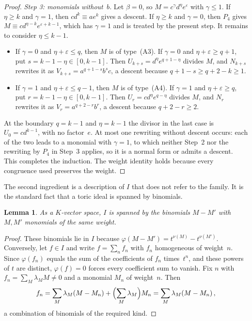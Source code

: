 \documentclass[11pt,letterpaper]{article}
\numberwithin{equation}{section}
\theoremstyle{plain}
\newtheorem{lemma}[theorem]{Lemma}
\theoremstyle{remark}
\begin{document}
\begin{proof}
\emph{Step 3: monomials without~$b$.} Let $\beta=0$, so $M=c^{\gamma}d^{\eta}e^{\varepsilon}$ with $\gamma\le 1$. If $\eta\ge k$ and $\gamma=1$, then $cd^k\equiv ae^k$ gives a descent. If $\eta\ge k$ and $\gamma=0$, then $P_4$ gives $M\equiv cd^{\eta-k}e^{\varepsilon+k-1}$, which has $\gamma=1$ and is treated by the present step. It remains to consider $\eta\le k-1$.
\begin{itemize}
\item If $\gamma=0$ and $\eta+\varepsilon\le q$, then $M$ is of type~(A3). If $\gamma=0$ and $\eta+\varepsilon\ge q+1$, put $s=k-1-\eta\in[0,k-1]$. Then $U_{k+s}=d^{\eta}e^{q+1-\eta}$ divides $M$, and $N_{k+s}$ rewrites it as $V_{k+s}=a^{q+1-s}b^{s}c$, a descent because $q+1-s\ge q+2-k\ge 1$.
\item If $\gamma=1$ and $\eta+\varepsilon\le q-1$, then $M$ is of type~(A4). If $\gamma=1$ and $\eta+\varepsilon\ge q$, put $r=k-1-\eta\in[0,k-1]$. Then $U_r=cd^{\eta}e^{q-\eta}$ divides $M$, and $N_r$ rewrites it as $V_r=a^{q+2-r}b^{r}$, a descent because $q+2-r\ge 2$.
\end{itemize}
At the boundary $q=k-1$ and $\eta=k-1$ the divisor in the last case is $U_0=cd^{k-1}$, with no factor~$e$. At most one rewriting without descent occurs: each of the two leads to a monomial with $\gamma=1$, to which neither Step~2 nor the rewriting by $P_4$ in Step~3 applies, so it is a normal form or admits a descent. This completes the induction. The weight identity holds because every congruence used preserves the weight.
\end{proof}

The second ingredient is a description of $I$ that does not refer to the family. It is the standard fact that a toric ideal is spanned by binomials.

\begin{lemma}\label{lem:binomials}
As a $K$-vector space, $I$ is spanned by the binomials $M-M'$ with $M,M'$ monomials of the same weight.
\end{lemma}

\begin{proof}
These binomials lie in $I$ because $\varphi(M-M')=t^{\nu(M)}-t^{\nu(M')}$. Conversely, let $f\in I$ and write $f=\sum_{n}f_n$ with $f_n$ homogeneous of weight~$n$. Since $\varphi(f_n)$ equals the sum of the coefficients of $f_n$ times~$t^n$, and these powers of $t$ are distinct, $\varphi(f)=0$ forces every coefficient sum to vanish. Fix $n$ with $f_n=\sum_M\lambda_MM\ne 0$ and a monomial $M_n$ of weight~$n$. Then
\begin{equation*}
f_n=\sum_M\lambda_M(M-M_n)+\Bigl(\sum_M\lambda_M\Bigr)M_n=\sum_M\lambda_M(M-M_n)\,,
\end{equation*}
a combination of binomials of the required kind.
\end{proof}
\end{document}
